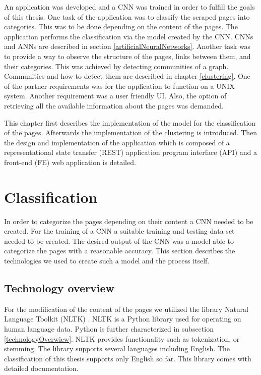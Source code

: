 \label{developmentIntroduction}
An application was developed and a CNN was trained in order to fulfill the goals of this thesis. One task of the application was to classify the scraped pages into categories. This was to be done depending on the content of the pages. The application performs the classification via the model created by the CNN. CNNs and ANNs are described in section \ref{artificialNeuralNetworks}. Another task was to provide a way to observe the structure of the pages, links between them, and their categories. This was achieved by detecting communities of a graph. Communities and how to detect them are described in chapter \ref{clustering}. One of the partner requirements was for the application to function on a UNIX system. Another requirement was a user friendly UI. Also, the option of retrieving all the available information about the pages was demanded. 

This chapter first describes the implementation of the model for the classification of the pages. Afterwards the implementation of the clustering is introduced. Then the design and implementation of the application which is composed of a representational state transfer (REST) application program interface (API) and a front-end (FE) web application is detailed. 

\section{Classification} \label{ClassificationDevelopment}
In order to categorize the pages depending on their content a CNN needed to be created. For the training of a CNN a suitable training and testing data set needed to be created. The desired output of the CNN was a model able to categorize the pages with a reasonable accuracy. This section describes the technologies we used to create such a model and the process itself.

\subsection{Technology overview} \label{ClassificationTechonologyOverview}
For the modification of the content of the pages we utilized the library Natural Language Toolkit (NLTK) \cite{nltk}. NLTK is a Python library used for operating on human language data. Python is further characterized in subsection \ref{technologyOverwiew}. NLTK provides functionality such as tokenization, or stemming. The library supports several languages including English. The classification of this thesis supports only English so far. This library comes with detailed documentation.

